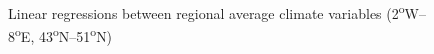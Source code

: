 \documentclass[final]{nature}
\begin{document}
\begin{figure}
\caption{Linear regressions between regional average climate variables (2\textsuperscript{o}W--8\textsuperscript{o}E, 43\textsuperscript{o}N--51\textsuperscript{o}N)}
\end{figure}



\end{document}
